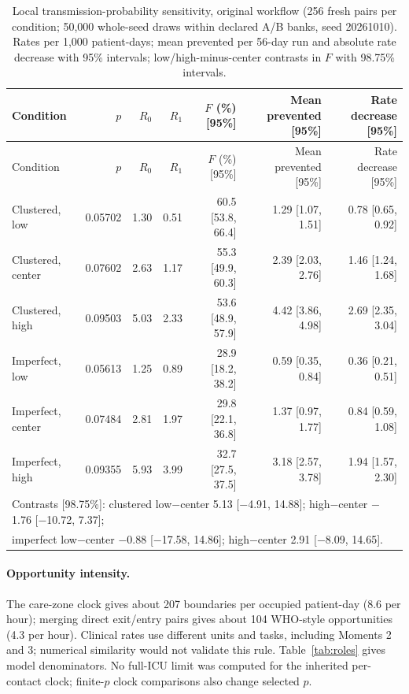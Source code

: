 \documentclass[11pt]{article}
\newcommand{\mn}{\ensuremath{-}}
\begin{document}
{\footnotesize
\begin{longtable}{lrrrrrr}
\caption{Local transmission-probability sensitivity, original workflow (256 fresh pairs per condition; 50,000 whole-seed draws within declared A/B banks, seed 20261010). Rates per 1,000 patient-days; mean prevented per 56-day run and absolute rate decrease with 95\% intervals; low/high-minus-center contrasts in $F$ with 98.75\% intervals.}\label{tab:p-sensitivity}\\
\toprule
Condition & $p$ & $R_0$ & $R_1$ & $F$ (\%) [95\%] & Mean prevented [95\%] & Rate decrease [95\%]\\\midrule\endfirsthead
Condition & $p$ & $R_0$ & $R_1$ & $F$ (\%) [95\%] & Mean prevented [95\%] & Rate decrease [95\%]\\\midrule\endhead
Clustered, low & 0.05702 & 1.30 & 0.51 & 60.5 [53.8, 66.4] & 1.29 [1.07, 1.51] & 0.78 [0.65, 0.92]\\
Clustered, center & 0.07602 & 2.63 & 1.17 & 55.3 [49.9, 60.3] & 2.39 [2.03, 2.76] & 1.46 [1.24, 1.68]\\
Clustered, high & 0.09503 & 5.03 & 2.33 & 53.6 [48.9, 57.9] & 4.42 [3.86, 4.98] & 2.69 [2.35, 3.04]\\
Imperfect, low & 0.05613 & 1.25 & 0.89 & 28.9 [18.2, 38.2] & 0.59 [0.35, 0.84] & 0.36 [0.21, 0.51]\\
Imperfect, center & 0.07484 & 2.81 & 1.97 & 29.8 [22.1, 36.8] & 1.37 [0.97, 1.77] & 0.84 [0.59, 1.08]\\
Imperfect, high & 0.09355 & 5.93 & 3.99 & 32.7 [27.5, 37.5] & 3.18 [2.57, 3.78] & 1.94 [1.57, 2.30]\\
\midrule
\multicolumn{7}{l}{Contrasts [98.75\%]: clustered low$-$center 5.13 [$\mn$4.91, 14.88]; high$-$center $\mn$1.76 [$\mn$10.72, 7.37];}\\
\multicolumn{7}{l}{\phantom{Contrasts [98.75\%]: }imperfect low$-$center $\mn$0.88 [$\mn$17.58, 14.86]; high$-$center 2.91 [$\mn$8.09, 14.65].}\\
\bottomrule\end{longtable}
}

\paragraph{Opportunity intensity.} The care-zone clock gives about 207
boundaries per occupied patient-day (8.6 per hour); merging direct exit/entry
pairs gives about 104 WHO-style opportunities (4.3 per hour).
Clinical rates use different units and tasks, including Moments 2 and 3;
numerical similarity would not validate this rule. Table~\ref{tab:roles} gives
model denominators. No full-ICU limit was computed for the inherited per-contact
clock; finite-$p$ clock comparisons also change selected $p$.
\end{document}
